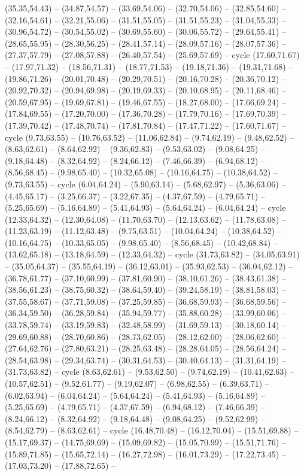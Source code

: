 {(35.35,54.43) -- (34.87,54.57) -- (33.69,54.06) -- (32.70,54.06) -- (32.85,54.60) -- (32.16,54.61) -- (32.21,55.06) -- (31.51,55.05) -- (31.51,55.23) -- (31.04,55.33) -- (30.96,54.72) -- (30.54,55.02) -- (30.69,55.60) -- (30.06,55.72) -- (29.64,55.41) -- (28.65,55.95) -- (28.30,56.25) -- (28.41,57.14) -- (28.09,57.16) -- (28.07,57.36) -- (27.37,57.79) -- (27.08,57.88) -- (26.40,57.54) -- (25.69,57.69) -- cycle (17.60,71.67) -- (17.97,71.32) -- (18.56,71.31) -- (18.77,71.53) -- (19.18,71.36) -- (19.31,71.68) -- (19.86,71.26) -- (20.01,70.48) -- (20.29,70.51) -- (20.16,70.28) -- (20.36,70.12) -- (20.92,70.32) -- (20.94,69.98) -- (20.19,69.33) -- (20.10,68.95) -- (20.11,68.46) -- (20.59,67.95) -- (19.69,67.81) -- (19.46,67.55) -- (18.27,68.00) -- (17.66,69.24) -- (17.84,69.55) -- (17.20,70.00) -- (17.36,70.28) -- (17.79,70.16) -- (17.69,70.39) -- (17.39,70.42) -- (17.48,70.74) -- (17.81,70.84) -- (17.47,71.22) -- (17.60,71.67) -- cycle (9.73,63.55) -- (10.76,63.52) -- (11.06,62.84) -- (9.74,62.19) -- (9.48,62.52) -- (8.63,62.61) -- (8.64,62.92) -- (9.36,62.83) -- (9.53,63.02) -- (9.08,64.25) -- (9.18,64.48) -- (8.32,64.92) -- (8.24,66.12) -- (7.46,66.39) -- (6.94,68.12) -- (8.56,68.45) -- (9.98,65.40) -- (10.32,65.08) -- (10.16,64.75) -- (10.38,64.52) -- (9.73,63.55) -- cycle (6.04,64.24) -- (5.90,63.14) -- (5.68,62.97) -- (5.36,63.06) -- (4.45,65.17) -- (3.25,66.37) -- (3.22,67.35) -- (4.37,67.59) -- (4.79,65.71) -- (5.25,65.69) -- (5.16,64.89) -- (5.41,64.93) -- (5.64,64.24) -- (6.04,64.24) -- cycle (12.33,64.32) -- (12.30,64.08) -- (11.70,63.70) -- (12.13,63.62) -- (11.78,63.08) -- (11.23,63.19) -- (11.12,63.48) -- (9.75,63.51) -- (10.04,64.24) -- (10.38,64.52) -- (10.16,64.75) -- (10.33,65.05) -- (9.98,65.40) -- (8.56,68.45) -- (10.42,68.84) -- (13.62,65.18) -- (13.18,64.59) -- (12.33,64.32) -- cycle (31.73,63.82) -- (34.05,63.91) -- (35.05,64.37) -- (35.55,64.19) -- (36.12,63.01) -- (35.93,62.53) -- (36.04,62.12) -- (36.78,61.77) -- (37.10,60.99) -- (37.81,60.90) -- (38.10,61.26) -- (38.43,61.38) -- (38.56,61.23) -- (38.75,60.32) -- (38.64,59.40) -- (39.24,58.19) -- (38.81,58.03) -- (37.55,58.67) -- (37.71,59.08) -- (37.25,59.85) -- (36.68,59.93) -- (36.68,59.56) -- (36.34,59.50) -- (36.28,59.84) -- (35.94,59.77) -- (35.88,60.28) -- (33.99,60.06) -- (33.78,59.74) -- (33.19,59.83) -- (32.48,58.99) -- (31.69,59.13) -- (30.18,60.14) -- (29.69,60.88) -- (28.70,60.86) -- (28.73,62.05) -- (28.12,62.00) -- (28.06,62.60) -- (27.64,62.76) -- (27.80,63.21) -- (28.25,63.48) -- (28.28,64.05) -- (28.56,64.24) -- (28.54,63.98) -- (29.34,63.74) -- (30.31,64.53) -- (30.40,64.13) -- (31.31,64.19) -- (31.73,63.82) -- cycle (8.63,62.61) -- (9.53,62.50) -- (9.74,62.19) -- (10.41,62.63) -- (10.57,62.51) -- (9.52,61.77) -- (9.19,62.07) -- (6.98,62.55) -- (6.39,63.71) -- (6.02,63.94) -- (6.04,64.24) -- (5.64,64.24) -- (5.41,64.93) -- (5.16,64.89) -- (5.25,65.69) -- (4.79,65.71) -- (4.37,67.59) -- (6.94,68.12) -- (7.46,66.39) -- (8.24,66.12) -- (8.32,64.92) -- (9.18,64.48) -- (9.08,64.25) -- (9.52,62.99) -- (8.54,62.79) -- (8.63,62.61) -- cycle (16.48,70.48) -- (16.12,70.04) -- (15.51,69.88) -- (15.17,69.37) -- (14.75,69.69) -- (15.09,69.82) -- (15.05,70.99) -- (15.51,71.76) -- (15.89,71.85) -- (15.65,72.14) -- (16.27,72.98) -- (16.01,73.29) -- (17.22,73.45) -- (17.03,73.20) -- (17.88,72.65) -- }
